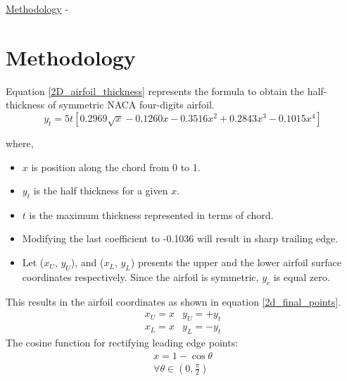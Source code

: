 \begin{frame}[allowframebreaks]{\underline{Methodology} -}
    \section{Methodology}
Equation \ref{2D_airfoil_thickness} represents the formula to obtain the half-thickness of symmetric NACA four-digits airfoil.
\begin{equation}
y_{t}=5 t\left[0.2969 \sqrt{x}-0.1260 x-0.3516 x^{2}+0.2843 x^{3}-0.1015 x^{4}\right]
\label{2D_airfoil_thickness}
\end{equation}
\parbox{0.55\linewidth}{
where,\\
\begin{itemize}
\item $x$ is position along the chord from 0 to 1.\\
\item $y_t$ is the half thickness for a given $x$.\\
\item $t$ is the maximum thickness represented in terms of chord.
\end{itemize}

\begin{itemize}
\item Modifying the last coefficient to -0.1036 will result in sharp trailing edge.
\item Let ($x_U$, $y_U$), and ($x_L$, $y_L$) presents the upper and the lower airfoil surface coordinates respectively. Since the airfoil is symmetric, $y_c$ is equal zero.
\end{itemize}

This results in the airfoil coordinates as shown in equation \ref{2d_final_points}.
\begin{equation}
\begin{array}{ll}
x_{U}=x & y_{U}= +y_{t} \\
x_{L}=x & y_{L}= -y_{t}
\end{array}
\label{2d_final_points}
\end{equation}
The cosine function for rectifying leading edge points:
\begin{equation}
    \begin{array}{l}
        x = 1 - \cos{\theta}  \\
        \forall  \theta \in \left(0, \frac{\pi}{2}\right)
    \end{array}
\label{cosine_function}
\end{equation}

}
\end{frame}
